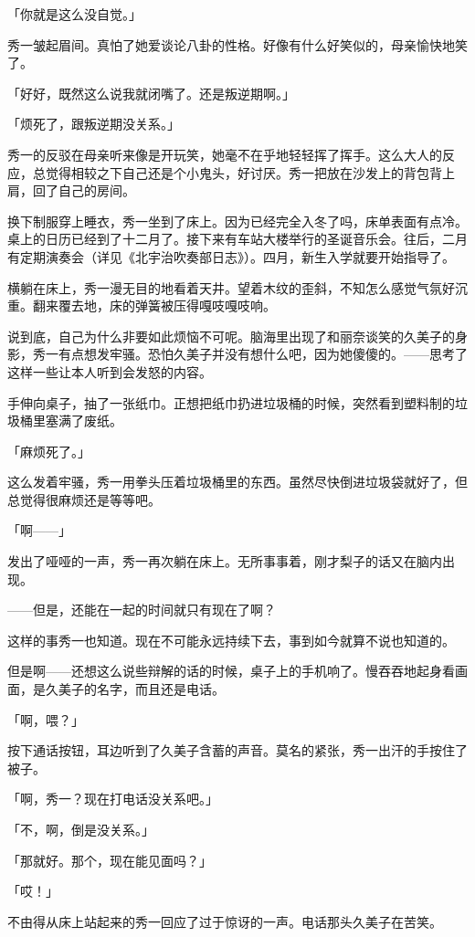 \documentclass[UTF8]{ctexart}
\begin{document}
    「你就是这么没自觉。」

    秀一皱起眉间。真怕了她爱谈论八卦的性格。好像有什么好笑似的，母亲愉快地笑了。

    「好好，既然这么说我就闭嘴了。还是叛逆期啊。」

    「烦死了，跟叛逆期没关系。」

    秀一的反驳在母亲听来像是开玩笑，她毫不在乎地轻轻挥了挥手。这么大人的反应，总觉得相较之下自己还是个小鬼头，好讨厌。秀一把放在沙发上的背包背上肩，回了自己的房间。

    换下制服穿上睡衣，秀一坐到了床上。因为已经完全入冬了吗，床单表面有点冷。桌上的日历已经到了十二月了。接下来有车站大楼举行的圣诞音乐会。往后，二月有定期演奏会（详见《北宇治吹奏部日志》）。四月，新生入学就要开始指导了。

    横躺在床上，秀一漫无目的地看着天井。望着木纹的歪斜，不知怎么感觉气氛好沉重。翻来覆去地，床的弹簧被压得嘎吱嘎吱响。

    说到底，自己为什么非要如此烦恼不可呢。脑海里出现了和丽奈谈笑的久美子的身影，秀一有点想发牢骚。恐怕久美子并没有想什么吧，因为她傻傻的。——思考了这样一些让本人听到会发怒的内容。

    手伸向桌子，抽了一张纸巾。正想把纸巾扔进垃圾桶的时候，突然看到塑料制的垃圾桶里塞满了废纸。

    「麻烦死了。」

    这么发着牢骚，秀一用拳头压着垃圾桶里的东西。虽然尽快倒进垃圾袋就好了，但总觉得很麻烦还是等等吧。

    「啊——」

    发出了哑哑的一声，秀一再次躺在床上。无所事事着，刚才梨子的话又在脑内出现。

    ——但是，还能在一起的时间就只有现在了啊？

    这样的事秀一也知道。现在不可能永远持续下去，事到如今就算不说也知道的。

    但是啊——还想这么说些辩解的话的时候，桌子上的手机响了。慢吞吞地起身看画面，是久美子的名字，而且还是电话。

    「啊，喂？」

    按下通话按钮，耳边听到了久美子含蓄的声音。莫名的紧张，秀一出汗的手按住了被子。

    「啊，秀一？现在打电话没关系吧。」

    「不，啊，倒是没关系。」

    「那就好。那个，现在能见面吗？」

    「哎！」

    不由得从床上站起来的秀一回应了过于惊讶的一声。电话那头久美子在苦笑。
\end{document}
